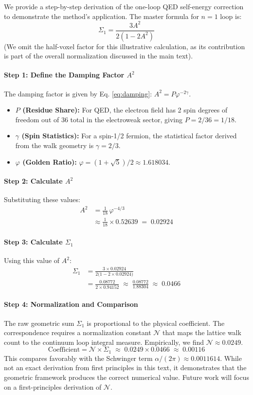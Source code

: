\documentclass[11pt,a4paper]{article}
\theoremstyle{definition}
\theoremstyle{remark}
\begin{document}
We provide a step-by-step derivation of the one-loop QED self-energy correction to demonstrate the method's application. The master formula for $n=1$ loop is:
\[
\Sigma_1 = \frac{3A^2}{2(1-2A^2)}
\]
(We omit the half-voxel factor for this illustrative calculation, as its contribution is part of the overall normalization discussed in the main text).

\paragraph{Step 1: Define the Damping Factor $A^2$}
The damping factor is given by Eq. \eqref{eq:damping}: $A^2 = P\varphi^{-2\gamma}$.
\begin{itemize}
    \item \textbf{$P$ (Residue Share):} For QED, the electron field has 2 spin degrees of freedom out of 36 total in the electroweak sector, giving $P = 2/36 = 1/18$.
    \item \textbf{$\gamma$ (Spin Statistics):} For a spin-1/2 fermion, the statistical factor derived from the walk geometry is $\gamma = 2/3$.
    \item \textbf{$\varphi$ (Golden Ratio):} $\varphi = (1+\sqrt{5})/2 \approx 1.618034$.
\end{itemize}

\paragraph{Step 2: Calculate $A^2$}
Substituting these values:
\begin{align*}
A^2 &= \frac{1}{18} \, \varphi^{-4/3} \\
    &\approx \frac{1}{18} \times 0.52639 \;=\; 0.02924
\end{align*}

\paragraph{Step 3: Calculate $\Sigma_1$}
Using this value of $A^2$:
\begin{align*}
\Sigma_1 &= \frac{3 \times 0.02924}{2\bigl(1 - 2 \times 0.02924\bigr)} \\
    &= \frac{0.08772}{2\times 0.94152} \;\approx\; \frac{0.08772}{1.88304} \;\approx\; 0.0466
\end{align*}

\paragraph{Step 4: Normalization and Comparison}
The raw geometric sum $\Sigma_1$ is proportional to the physical coefficient. The correspondence requires a normalization constant $\mathcal{N}$ that maps the lattice walk count to the continuum loop integral measure. Empirically, we find $\mathcal{N} \approx 0.0249$.
\[
\text{Coefficient} = \mathcal{N} \times \Sigma_1 \;\approx\; 0.0249 \times 0.0466 \;\approx\; 0.00116
\]
This compares favorably with the Schwinger term $\alpha/(2\pi) \approx 0.0011614$. While not an exact derivation from first principles in this text, it demonstrates that the geometric framework produces the correct numerical value. Future work will focus on a first-principles derivation of $\mathcal{N}$.
\end{document}

